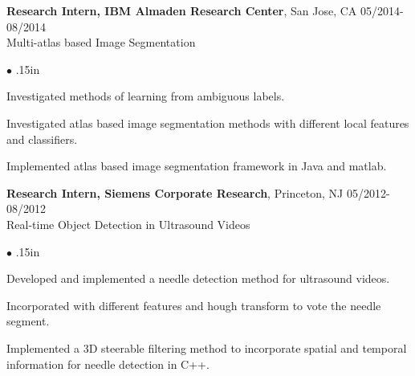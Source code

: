 \documentclass[line,margin]{res}
\newenvironment{bullets}{\begin{list}{\tiny$\bullet$}{\topsep 0pt \itemsep -2pt \leftmargin .15in}}{\vspace*{4pt}\end{list}}
\begin{document}
\begin{resume}
\textbf{Research Intern, IBM Almaden Research Center}, San Jose, CA \hfill      05/2014-08/2014 \\
Multi-atlas based Image Segmentation
\begin{bullets} 
\item Investigated methods of learning from ambiguous labels.
\item Investigated atlas based image segmentation methods with different local features and classifiers.
\item Implemented atlas based image segmentation framework in Java and matlab.
\end{bullets}
\vspace{-.1in}

\textbf{Research Intern, Siemens Corporate Research}, Princeton, NJ \hfill      05/2012-08/2012 \\
Real-time Object Detection in Ultrasound Videos
\begin{bullets} 
\item Developed and implemented a needle detection method for ultrasound videos. 
\item Incorporated with different features and hough transform to vote the needle segment.
\item Implemented a 3D steerable filtering method to incorporate spatial and temporal information for needle detection in C++.

\end{bullets}
\vspace{-.1in}


\end{resume}
\end{document}
